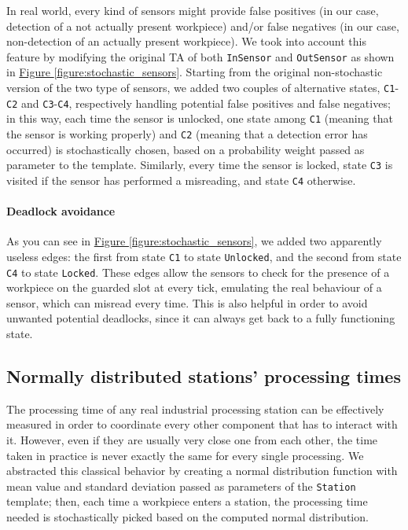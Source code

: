 \documentclass[a4paper,twoside]{article}
\newcommand{\figureref}[1]{\textsf{\hyperref[#1]{Figure \ref*{#1}}}}
\begin{document}
    In real world, every kind of sensors might provide false positives (in our case, detection of a not actually present workpiece) and/or false negatives (in our case, non-detection of an actually present workpiece). We took into account this feature by modifying the original TA of both \texttt{InSensor} and \texttt{OutSensor} as shown in \figureref{figure:stochastic_sensors}. Starting from the original non-stochastic version of the two type of sensors, we added two couples of alternative states, \texttt{C1}-\texttt{C2} and \texttt{C3}-\texttt{C4}, respectively handling potential false positives and false negatives; in this way, each time the sensor is unlocked, one state among \texttt{C1} (meaning that the sensor is working properly) and \texttt{C2} (meaning that a detection error has occurred) is stochastically chosen, based on a probability weight passed as parameter to the template. Similarly, every time the sensor is locked, state \texttt{C3} is visited if the sensor has performed a misreading, and state \texttt{C4} otherwise.

    \paragraph{Deadlock avoidance} As you can see in \figureref{figure:stochastic_sensors}, we added two apparently useless edges: the first from state \texttt{C1} to state \texttt{Unlocked}, and the second from state \texttt{C4} to state \texttt{Locked}. These edges allow the sensors to check for the presence of a workpiece on the guarded slot at every tick, emulating the real behaviour of a sensor, which can misread every time. This is also helpful in order to avoid unwanted potential deadlocks, since it can always get back to a fully functioning state.

    \subsection{Normally distributed stations' processing times}

    The processing time of any real industrial processing station can be effectively measured in order to coordinate every other component that has to interact with it. However, even if they are usually very close one from each other, the time taken in practice is never exactly the same for every single processing. We abstracted this classical behavior by creating a normal distribution function with mean value and standard deviation passed as parameters of the \texttt{Station} template; then, each time a workpiece enters a station, the processing time needed is stochastically picked based on the computed normal distribution.
\end{document}
